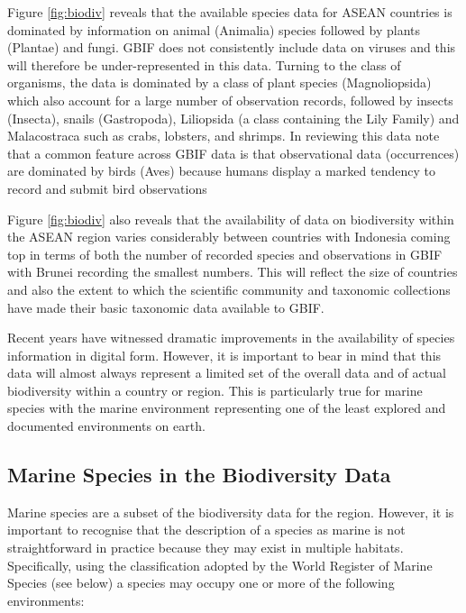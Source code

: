 \documentclass[openany]{book}
\theoremstyle{definition}
\theoremstyle{definition}
\theoremstyle{definition}
\theoremstyle{remark}
\begin{document}
Figure \ref{fig:biodiv} reveals that the available species data for
ASEAN countries is dominated by information on animal (Animalia) species
followed by plants (Plantae) and fungi. GBIF does not consistently
include data on viruses and this will therefore be under-represented in
this data. Turning to the class of organisms, the data is dominated by a
class of plant species (Magnoliopsida) which also account for a large
number of observation records, followed by insects (Insecta), snails
(Gastropoda), Liliopsida (a class containing the Lily Family) and
Malacostraca such as crabs, lobsters, and shrimps. In reviewing this
data note that a common feature across GBIF data is that observational
data (occurrences) are dominated by birds (Aves) because humans display
a marked tendency to record and submit bird observations

Figure \ref{fig:biodiv} also reveals that the availability of data on
biodiversity within the ASEAN region varies considerably between
countries with Indonesia coming top in terms of both the number of
recorded species and observations in GBIF with Brunei recording the
smallest numbers. This will reflect the size of countries and also the
extent to which the scientific community and taxonomic collections have
made their basic taxonomic data available to GBIF.

Recent years have witnessed dramatic improvements in the availability of
species information in digital form. However, it is important to bear in
mind that this data will almost always represent a limited set of the
overall data and of actual biodiversity within a country or region. This
is particularly true for marine species with the marine environment
representing one of the least explored and documented environments on
earth.

\hypertarget{marine-species-in-the-biodiversity-data}{%
\subsection{Marine Species in the Biodiversity
Data}\label{marine-species-in-the-biodiversity-data}}

Marine species are a subset of the biodiversity data for the region.
However, it is important to recognise that the description of a species
as marine is not straightforward in practice because they may exist in
multiple habitats. Specifically, using the classification adopted by the
World Register of Marine Species (see below) a species may occupy one or
more of the following environments:
\end{document}
